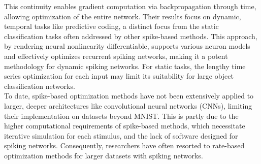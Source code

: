 \noindent This continuity enables gradient computation via backpropagation through time, allowing optimization of the entire network. Their results focus on dynamic, temporal tasks like predictive coding, a distinct focus from the static classification tasks often addressed by other spike-based methods. This approach, by rendering neural nonlinearity differentiable, supports various neuron models and effectively optimizes recurrent spiking networks, making it a potent methodology for dynamic spiking networks. For static tasks, the lengthy time series optimization for each input may limit its suitability for large object classification networks.\\




\noindent To date, spike-based optimization methods have not been extensively applied to larger, deeper architectures like convolutional neural networks (CNNs), limiting their implementation on datasets beyond MNIST. This is partly due to the higher computational requirements of spike-based methods, which necessitate iterative simulation for each stimulus, and the lack of software designed for spiking networks. Consequently, researchers have often resorted to rate-based optimization methods for larger datasets with spiking networks.\\


